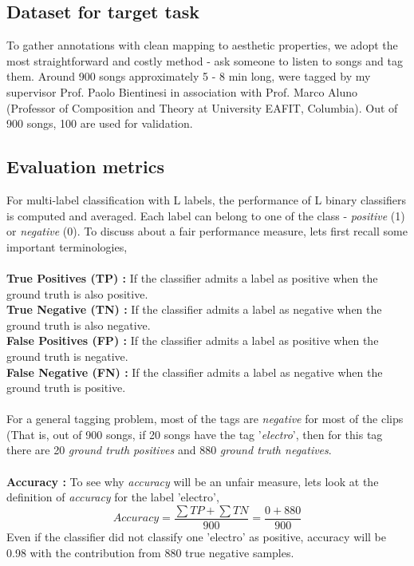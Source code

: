 \subsection{Dataset for target task}
\label{target}
To gather annotations with clean mapping to aesthetic properties, we adopt the most straightforward and costly method - ask someone to listen to songs and tag them. Around 900 songs approximately 5 - 8 min long, were tagged by my supervisor Prof. Paolo Bientinesi in association with Prof. Marco Aluno (Professor of Composition and Theory at University EAFIT, Columbia). Out of 900 songs, 100 are used for validation.  

\subsection{Evaluation metrics}
\label{evaluation}
For multi-label classification with L labels, the performance of L binary classifiers is computed and averaged. Each label can belong to one of the class - \textit{positive} (1) or \textit{negative} (0). To discuss about a fair performance measure, lets first recall some important terminologies,\\
\\
\textbf{True Positives (TP) :} If the classifier admits a label as positive when the ground truth is also positive.\\
\textbf{True Negative (TN) :} If the classifier admits a label as negative when the ground truth is also negative.\\
\textbf{False Positives (FP) :} If the classifier admits a label as positive when the ground truth is negative.\\
\textbf{False Negative (FN) :} If the classifier admits a label as negative when the ground truth is positive.\\
\\
For a general tagging problem, most of the tags are \textit{negative} for most of the clips (That is, out of 900 songs, if 20 songs have the tag '\textit{electro}', then for this tag there are 20 \textit{ground truth positives} and 880 \textit{ground truth negatives}.\\
\\
\textbf{Accuracy :} To see why \textit{accuracy} will be an unfair measure, lets look at the definition of \textit{accuracy} for the label 'electro',
\[
  Accuracy = \frac{\sum TP + \sum TN}{900} = \frac{0+880}{900}
\]
Even if the classifier did not classify one 'electro' as positive, accuracy will be 0.98 with the contribution from 880 true negative samples.\\
